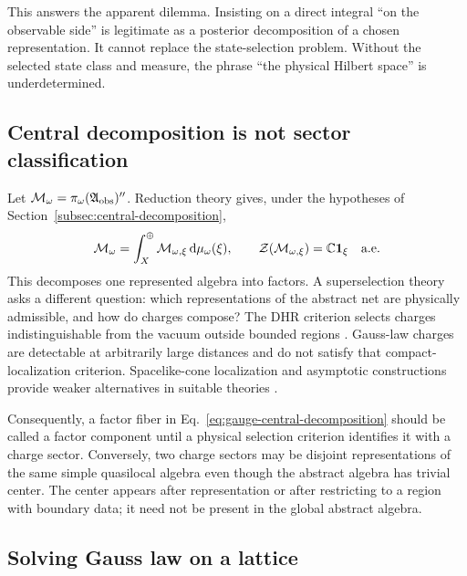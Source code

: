 This answers the apparent dilemma.  Insisting on a direct integral ``on the
observable side'' is legitimate as a posterior decomposition of a chosen
representation.  It cannot replace the state-selection problem.  Without the
selected state class and measure, the phrase ``the physical Hilbert space''
is underdetermined.

\subsection{Central decomposition is not sector classification}

Let
$\mathcal{M}_\omega=\pi_\omega(\mathfrak{A}_{\mathrm{obs}})''$.  Reduction theory gives,
under the hypotheses of Section~\ref{subsec:central-decomposition},
\begin{equation}
  \mathcal{M}_\omega
  =\int_X^\oplus\mathcal{M}_{\omega,\xi}\,\mathrm{d}\mu_\omega(\xi),
  \qquad
  \mathcal{Z}(\mathcal{M}_{\omega,\xi})
  =\mathbb{C}\mathbf{1}_\xi
  \quad\text{a.e.}
  \label{eq:gauge-central-decomposition}
\end{equation}
This decomposes one represented algebra into factors.  A superselection
theory asks a different question: which representations of the abstract net
are physically admissible, and how do charges compose?  The DHR criterion
selects charges indistinguishable from the vacuum outside bounded regions
\cite{DoplicherHaagRoberts:1971}.  Gauss-law charges are detectable at
arbitrarily large distances and do not satisfy that compact-localization
criterion.  Spacelike-cone localization and asymptotic constructions provide
weaker alternatives in suitable theories
\cite{BuchholzFredenhagen:1982,Buchholz:1986}.

Consequently, a factor fiber in
Eq.~\eqref{eq:gauge-central-decomposition} should be called a factor
component until a physical selection criterion identifies it with a charge
sector.  Conversely, two charge sectors may be disjoint representations of
the same simple quasilocal algebra even though the abstract algebra has
trivial center.  The center appears after representation or after restricting
to a region with boundary data; it need not be present in the global abstract
algebra.

\subsection{Solving Gauss law on a lattice}

